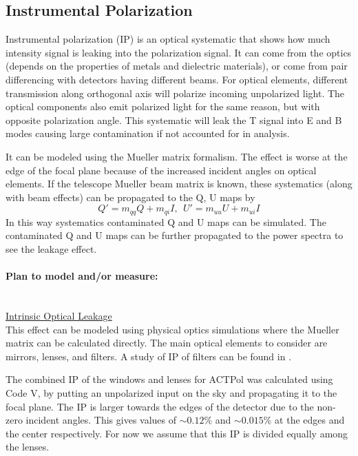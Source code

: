 \subsection{Instrumental Polarization} 
\label{instrumental_polarization}

Instrumental polarization (IP) is an optical systematic that shows how much intensity signal is leaking into the polarization signal. It can come from the optics (depends on the properties of metals and dielectric materials), or come from pair differencing with detectors having different beams. For optical elements, different transmission along orthogonal axis will polarize incoming unpolarized light. The optical components also emit polarized light for the same reason, but with opposite polarization angle.
This systematic will leak the T signal into E and B modes causing large contamination if not accounted for in analysis.

It can be modeled using the Mueller matrix formalism. The effect is worse at the edge of the focal plane because of the increased incident angles on optical elements. If the telescope Mueller beam matrix is known, these systematics (along with beam effects) can be propagated to the Q, U maps by
\begin{equation}
Q' = m_{qq} Q + m_{qi} I, \ \ U' = m_{uu} U + m_{ui} I
\end{equation}
In this way systematics contaminated Q and U maps can be simulated. The contaminated Q and U maps can be further propagated to the power spectra to see the leakage effect.

\paragraph{Plan to model and/or measure:} \mbox{}\\
\noindent \underline{Intrinsic Optical Leakage} \\
This effect can be modeled using physical optics simulations where the Mueller matrix can be calculated directly. 
The main optical elements to consider are mirrors, lenses, and filters.
A study of IP of filters can be found in \cite{pisano2005}.

The combined IP of the windows and lenses for ACTPol was calculated using Code V, 
by putting an unpolarized input on the sky and propagating it to the focal plane.
The IP is larger towards the edges of the detector due to the non-zero incident angles.
This gives values of $\sim0.12\%$ and $\sim0.015\%$ at the edges and the center respectively.
For now we assume that this IP is divided equally among the lenses.

